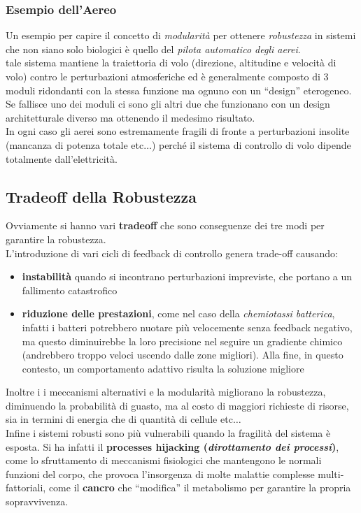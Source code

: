 \documentclass[a4paper,12pt, oneside]{book}
\begin{document}
\subsubsection{Esempio dell'Aereo}
Un esempio per capire il concetto di \textit{modularità} per ottenere
\textit{robustezza} in sistemi che non 
siano solo biologici è quello del \textit{pilota automatico degli aerei}.\\
tale sistema mantiene la traiettoria di volo (direzione, altitudine e velocità
di volo) contro le perturbazioni atmosferiche ed è generalmente composto di 3
moduli ridondanti con la stessa funzione ma ognuno con un ``design''
eterogeneo. Se fallisce uno dei moduli ci sono gli altri due che funzionano con
un design architetturale diverso ma ottenendo il medesimo risultato. \\
In ogni caso gli aerei sono estremamente fragili di fronte a perturbazioni
insolite (mancanza di potenza totale etc$\ldots$) perché il sistema di controllo
di volo dipende totalmente dall'elettricità.
\subsection{Tradeoff della Robustezza}
Ovviamente si hanno vari \textbf{tradeoff} che sono conseguenze dei tre
modi per garantire la robustezza.\\
L'introduzione di vari cicli di feedback di controllo genera trade-off causando:
\begin{itemize}
  \item \textbf{instabilità} quando si incontrano perturbazioni impreviste, che
  portano a un fallimento catastrofico 
  \item \textbf{riduzione delle prestazioni}, come nel caso della
  \textit{chemiotassi batterica}, infatti i batteri potrebbero nuotare più
  velocemente senza feedback negativo, ma questo diminuirebbe la loro precisione
  nel seguire un gradiente chimico (andrebbero troppo veloci uscendo dalle zone
  migliori). Alla fine, in questo contesto, un comportamento adattivo risulta la
  soluzione migliore
\end{itemize}
Inoltre i i meccanismi alternativi e la modularità migliorano la robustezza,
diminuendo la probabilità di guasto, ma al costo di maggiori richieste di
risorse, sia in termini di energia che di quantità di cellule etc$\ldots$\\
Infine i sistemi robusti sono più vulnerabili quando la fragilità del sistema è
esposta. Si ha infatti il \textbf{processes hijacking (\textit{dirottamento
    dei processi})}, come lo sfruttamento di meccanismi
fisiologici che mantengono le normali funzioni del corpo, che provoca
l'insorgenza di molte malattie complesse multi-fattoriali, come il
\textbf{cancro} che ``modifica'' il metabolismo per garantire la propria
sopravvivenza.
\end{document}
